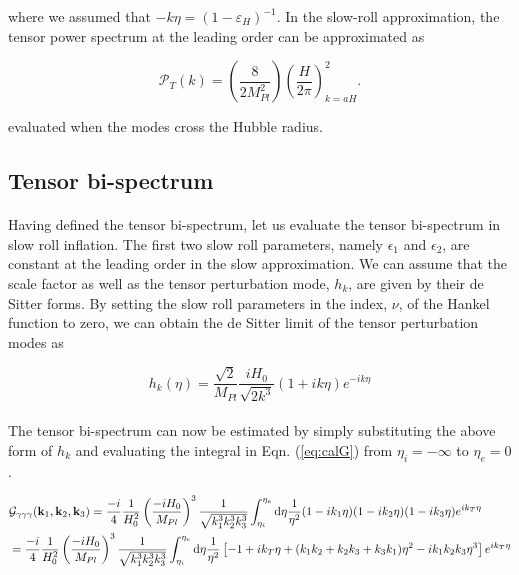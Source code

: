 \documentclass[12pt,a4paper,oneside]{book}
\begin{document}
\noindent where we assumed that $-k\eta = (1-\varepsilon_H)^{-1}$. In the slow-roll approximation, 
the tensor power spectrum at the leading order can be approximated as 

\begin{equation}
\mathcal{P}_T(k) = \left(\frac{8}{2M_{Pl}^2}\right)\left(\frac{H}{2\pi}\right)^2_{k=aH}.
\end{equation}

\noindent evaluated when the modes cross the Hubble radius.

\subsection{Tensor bi-spectrum}

\paragraph*{} Having defined the tensor bi-spectrum, let us evaluate the tensor 
bi-spectrum in slow roll inflation. The first two slow roll parameters, namely 
$\epsilon_1$ and $\epsilon_2$, are constant at the leading order in the slow 
approximation. We can assume that the scale factor as well as the tensor perturbation 
mode, $h_k$, are given by their de Sitter forms. By setting the slow roll parameters in 
the index, $\nu$, of the Hankel function to zero, we 
can obtain the de Sitter limit of the tensor perturbation modes as

\begin{equation}
h_k(\eta) = \frac{\sqrt{2}}{M_{Pl}}\frac{iH_0}{\sqrt{2k^3}}(1+ik\eta)e^{-ik\eta}
\end{equation}

\paragraph*{} The tensor bi-spectrum can now be estimated by simply 
substituting the above form of $h_k$ and evaluating the integral in Eqn. (\ref{eq:calG}) 
from $\eta_i = -\infty$ to $\eta_e = 0$.

\begin{align*}
& \mathcal{G}_{\gamma\gamma\gamma}({\bf k}_1, {\bf k}_2, {\bf k}_3) = 
\frac{-i}{4}\frac{1}{H_0^2}\left(\frac{-iH_0}{M_{Pl}}\right)^3 \frac{1}{\sqrt{k_1^3k_2^3k_3^3}} 
\int^{\eta_e}_{\eta_i}{\rm d}\eta \frac{1}{\eta^2}(1-ik_1\eta)(1-ik_2\eta)(1-ik_3\eta)e^{ik_T\eta} \\
& =  \frac{-i}{4}\frac{1}{H_0^2}\left(\frac{-iH_0}{M_{Pl}}\right)^3 \frac{1}{\sqrt{k_1^3k_2^3k_3^3}}
 \int^{\eta_e}_{\eta_i}{\rm d}\eta \frac{1}{\eta^2}\left[-1+ik_T\eta +(k_1k_2 +k_2k_3 +k_3k_1)\eta^2 -ik_1k_2k_3\eta^3\right]e^{ik_T\eta}
\end{align*}
\end{document}

